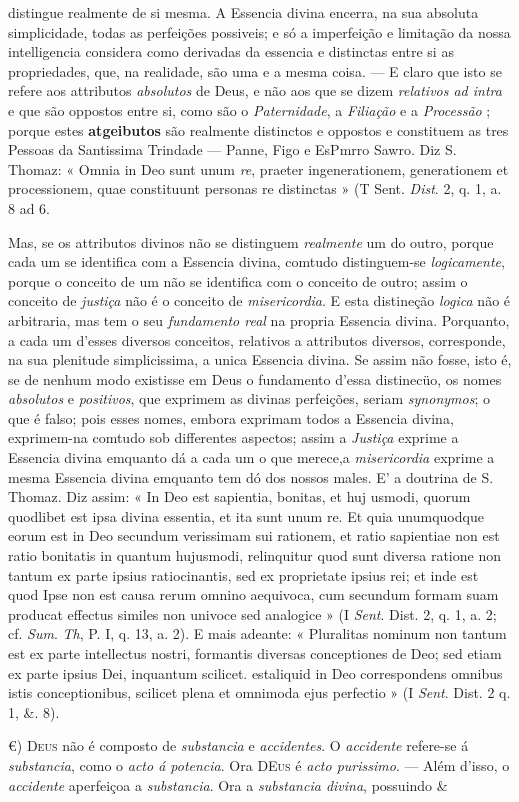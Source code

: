 distingue realmente de si mesma. A Essencia divina encerra, na sua absoluta simplicidade, todas as perfeições possiveis; e só a imperfeição e limitação da nossa intelligencia considera como derivadas da essencia e distinctas entre si as propriedades, que, na realidade, são uma e a mesma coisa. --- E claro que isto se refere aos attributos \emph{absolutos} de Deus, e não aos que se dizem \emph{relativos ad intra} e que são oppostos entre si, como são o \emph{Paternidade}, a \emph{Filiação} e a \emph{Processão} ; porque estes \textbf{atgeibutos} são realmente distinctos e oppostos e constituem as tres Pessoas da Santissima Trindade --- Panne, Figo e EsPmrro Sawro. Diz S. Thomaz: « Omnia in Deo sunt unum \emph{re}, praeter ingenerationem, generationem et processionem, quae constituunt personas re distinctas » (T Sent. \emph{Dist}. 2, q. 1, a. 8 ad 6.\par Mas, se os attributos divinos não se distinguem \emph{realmente} um do outro, porque cada um se identifica com a Essencia divina, comtudo distinguem-se \emph{logicamente}, porque o conceito de um não se identifica com o conceito de outro; assim o conceito de \emph{justiça} não é o conceito de \emph{misericordia}. E esta distineção \emph{logica} não é arbitraria, mas tem o seu \emph{fundamento real} na propria Essencia divina. Porquanto, a cada um d'esses diversos conceitos, relativos a attributos diversos, corresponde, na sua plenitude simplicissima, a unica Essencia divina. Se assim não fosse, isto é, se de nenhum modo existisse em Deus o fundamento d'essa distinecüo, os nomes \emph{absolutos} e \emph{positivos}, que exprimem as divinas perfeições, seriam \emph{synonymos}; o que é falso; pois esses nomes, embora exprimam todos a Essencia divina, exprimem-na comtudo sob differentes aspectos; assim a \emph{Justiça} exprime a Essencia divina emquanto dá a cada um o que merece,a \emph{misericordia} exprime a mesma Essencia divina emquanto tem dó dos nossos males. E' a doutrina de S. Thomaz. Diz assim: « In Deo est sapientia, bonitas, et huj usmodi, quorum quodlibet est ipsa divina essentia, et ita sunt unum re. Et quia unumquodque eorum est in Deo secundum verissimam sui rationem, et ratio sapientiae non est ratio bonitatis in quantum hujusmodi, relinquitur quod sunt diversa ratione non tantum ex parte ipsius ratiocinantis, sed ex proprietate ipsius rei; et inde est quod Ipse non est causa rerum omnino aequivoca, cum secundum formam suam producat effectus similes non univoce sed analogice » (I \emph{Sent}. Dist. 2, q. 1, a. 2; cf. \emph{Sum}. \emph{Th}, P. I, q. 13, a. 2). E mais adeante: « Pluralitas nominum non tantum est ex parte intellectus nostri, formantis diversas conceptiones de Deo; sed etiam ex parte ipsius Dei, inquantum scilicet. estaliquid in Deo correspondens omnibus istis conceptionibus, scilicet plena et omnimoda ejus perfectio » (I \emph{Sent}. Dist. 2 q. 1, \&. 8).\par €) \textsc{Deus} não é composto de \emph{substancia} e \emph{accidentes}. O \emph{accidente} refere-se á \emph{substancia}, como o \emph{acto á potencia}. Ora \textsc{DEus} é \emph{acto purissimo}. --- Além d'isso, o \emph{accidente} aperfeiçoa a \emph{substancia}. Ora a \emph{substancia divina}, possuindo \& 